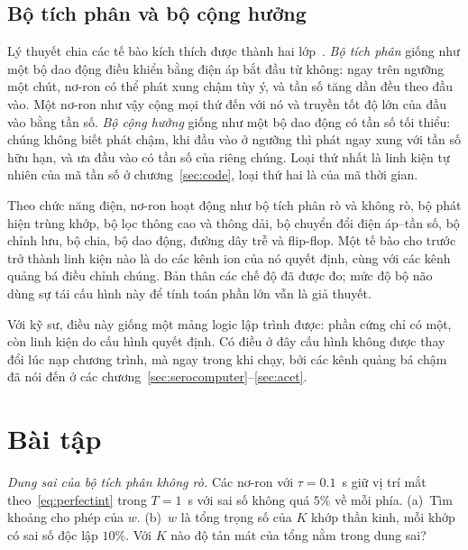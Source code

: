 \subsection{Bộ tích phân và bộ cộng hưởng}

Lý thuyết chia các tế bào kích thích được thành hai lớp~\cite{Izhikevich2007}. \emph{Bộ tích phân} giống như một bộ dao động điều khiển bằng điện áp bắt đầu từ không: ngay trên ngưỡng một chút, nơ-ron có thể phát xung chậm tùy ý, và tần số tăng dần đều theo đầu vào. Một nơ-ron như vậy cộng mọi thứ đến với nó và truyền tốt độ lớn của đầu vào bằng tần số. \emph{Bộ cộng hưởng} giống như một bộ dao động có tần số tối thiểu: chúng không biết phát chậm, khi đầu vào ở ngưỡng thì phát ngay xung với tần số hữu hạn, và ưa đầu vào có tần số của riêng chúng. Loại thứ nhất là linh kiện tự nhiên của mã tần số ở chương~\ref{sec:code}, loại thứ hai là của mã thời gian.

\begin{keyblock}
\begin{proposition}
\label{prop:eetypes}
Theo chức năng điện, nơ-ron hoạt động như bộ tích phân rò và không rò, bộ phát hiện trùng khớp, bộ lọc thông cao và thông dải, bộ chuyển đổi điện áp--tần số, bộ chỉnh lưu, bộ chia, bộ dao động, đường dây trễ và flip-flop. Một tế bào cho trước trở thành linh kiện nào là do các kênh ion của nó quyết định, cùng với các kênh quảng bá điều chỉnh chúng. Bản thân các chế độ đã được đo; mức độ bộ não dùng sự tái cấu hình này để tính toán phần lớn vẫn là giả thuyết.
\end{proposition}
\end{keyblock}

Với kỹ sư, điều này giống một mảng logic lập trình được: phần cứng chỉ có một, còn linh kiện do cấu hình quyết định. Có điều ở đây cấu hình không được thay đổi lúc nạp chương trình, mà ngay trong khi chạy, bởi các kênh quảng bá chậm đã nói đến ở các chương~\ref{sec:serocomputer}--\ref{sec:acet}.

\section{Bài tập}

\begin{exercise}[\lvlA]
\label{ex:18:1}
\emph{Dung sai của bộ tích phân không rò.} Các nơ-ron với $\tau=0.1$~s giữ vị trí mắt theo~\eqref{eq:perfectint} trong $T=1$~s với sai số không quá $5\%$ về mỗi phía. (a)~Tìm khoảng cho phép của $w$. (b)~$w$ là tổng trọng số của $K$ khớp thần kinh, mỗi khớp có sai số độc lập $10\%$. Với $K$ nào độ tản mát của tổng nằm trong dung sai?
\end{exercise}

